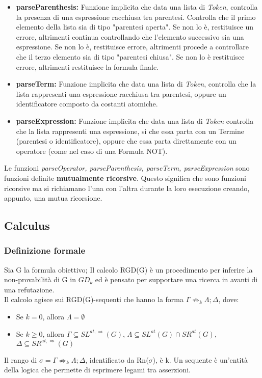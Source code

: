 \documentclass[\main/tesi.tex]{subfiles}
\begin{document}
\begin{itemize}
    \item \textbf{parseParenthesis:} Funzione implicita che data una lista di \textit{Token}, controlla la presenza di una espressione racchiusa tra parentesi. Controlla che il primo elemento della lista sia di tipo "parentesi aperta". Se non lo è, restituisce un errore, altrimenti continua controllando che l'elemento successivo sia una espressione. Se non lo è, restituisce errore, altrimenti procede a controllare che il terzo elemento sia di tipo "parentesi chiusa". Se non lo è restituisce errore, altrimenti restituisce la formula finale.
    \item \textbf{parseTerm:} Funzione implicita che data una lista di \textit{Token}, controlla che la lista rappresenti una espressione racchiusa tra parentesi, oppure un identificatore composto da costanti atomiche.
    \item \textbf{parseExpression:} Funzione implicita che data una lista di \textit{Token} controlla che la lista rappresenti una espressione, si che essa parta con un Termine (parentesi o identificatore), oppure che essa parta direttamente con un operatore (come nel caso di una Formula NOT).
\end{itemize}
Le funzioni \textit{parseOperator, parseParenthesis, parseTerm, parseExpression} sono funzioni definite \textbf{mutualmente ricorsive}. Questo significa che sono funzioni ricorsive ma si richiamano l'una con l'altra durante la loro esecuzione creando, appunto, una mutua ricorsione.

\subsection{Calculus}

\subsubsection{Definizione formale}
Sia G la formula obiettivo; Il calcolo RGD(G) è un procedimento per inferire la non-provabilità di G in $GD_k$ ed è pensato per supportare una ricerca in avanti di una refutazione.\\
Il calcolo agisce sui RGD(G)-sequenti che hanno la forma $\Gamma \not\Rightarrow_k \Lambda; \Delta$, dove:
\begin{itemize}
    \item Se $k = 0$, allora $\Lambda = \emptyset$
    \item Se $k \geq 0$, allora $\Gamma \subseteq SL^{at,\Rightarrow}(G)$, $\Lambda \subseteq SL^{at}(G) \cap SR^{at}(G)$, $\Delta \subseteq SR^{at,\Rightarrow}(G)$
\end{itemize}
Il rango di $\sigma = \Gamma \not\Rightarrow_k \Lambda; \Delta$, identificato da Rn($\sigma$), è k. Un sequente è un'entità della logica che permette di esprimere legami tra asserzioni.
\end{document}
